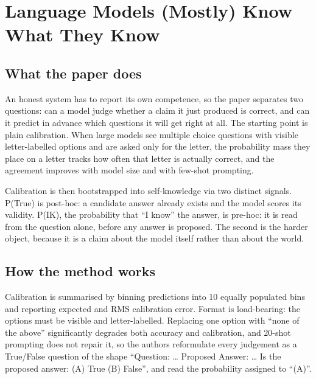 \section{Language Models (Mostly) Know What They Know}

\subsection{What the paper does}

An honest system has to report its own competence, so the paper separates two questions: can a model judge whether a claim it just produced is correct, and can it predict in advance which questions it will get right at all. The starting point is plain calibration. When large models see multiple choice questions with visible letter-labelled options and are asked only for the letter, the probability mass they place on a letter tracks how often that letter is actually correct, and the agreement improves with model size and with few-shot prompting.

Calibration is then bootstrapped into self-knowledge via two distinct signals. P(True) is post-hoc: a candidate answer already exists and the model scores its validity. P(IK), the probability that ``I know'' the answer, is pre-hoc: it is read from the question alone, before any answer is proposed. The second is the harder object, because it is a claim about the model itself rather than about the world.

\subsection{How the method works}

Calibration is summarised by binning predictions into 10 equally populated bins and reporting expected and RMS calibration error. Format is load-bearing: the options must be visible and letter-labelled. Replacing one option with ``none of the above'' significantly degrades both accuracy and calibration, and 20-shot prompting does not repair it, so the authors reformulate every judgement as a True/False question of the shape ``Question: \ldots{} Proposed Answer: \ldots{} Is the proposed answer: (A) True (B) False'', and read the probability assigned to ``(A)''.

